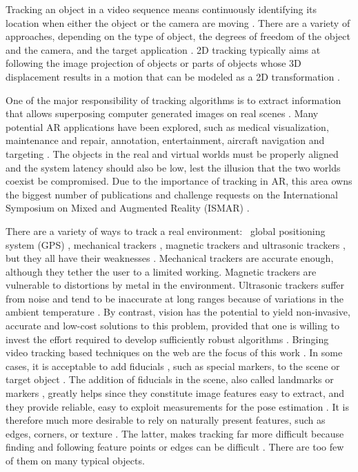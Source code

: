 Tracking an object in a video sequence means continuously identifying its location when either the object or the camera are moving \cite{Lepetit2005}. There are a variety of approaches, depending on the type of object, the degrees of freedom of the object and the camera, and the target application \cite{Lepetit2005,Teichrieb2007}.
2D tracking typically aims at following the image projection of objects or parts of objects whose 3D displacement results in a motion that can be modeled as a 2D transformation \cite{Lepetit2005}.

One of the major responsibility of tracking algorithms is to extract information that allows superposing computer generated images on real scenes \cite{Lepetit2005}. Many potential AR applications have been explored, such as medical visualization, maintenance and repair, annotation, entertainment, aircraft navigation and targeting \cite{Lepetit2005,Krevelen2010}. The objects in the real and virtual worlds must be properly aligned and the system latency should also be low, lest the illusion that the two worlds coexist be compromised. \cite{Lepetit2005} Due to the importance of tracking in AR, this area owns the biggest number of publications and challenge requests on the International Symposium on Mixed and Augmented Reality (ISMAR) \cite{Zhou2008}.

There are a variety of ways to track a real environment: \eg\ global positioning system (GPS) \cite{Krevelen2010}, mechanical trackers \cite{Krevelen2010}, magnetic trackers \cite{Krevelen2010} and ultrasonic trackers \cite{Krevelen2010}, but they all have their weaknesses \cite{Krevelen2010}. Mechanical trackers are accurate enough, although they tether the user to a limited working. Magnetic trackers are vulnerable to distortions by metal in the environment. Ultrasonic trackers suffer from noise and tend to be inaccurate at long ranges because of variations in the ambient temperature \cite{Lepetit2005}.
By contrast, vision has the potential to yield non-invasive, accurate and low-cost solutions to this problem, provided that one is willing to invest the effort required to develop sufficiently robust algorithms \cite{Lepetit2005}. Bringing video tracking based techniques on the web are the focus of this work \cite{Lepetit2005}.
In some cases, it is acceptable to add fiducials \cite{Cho1998}, such as special markers, to the scene or target object \cite{Cho1998,Lepetit2005}. The addition of fiducials in the scene, also called landmarks or markers \cite{Cho1998}, greatly helps since they constitute image features easy to extract, and they provide reliable, easy to exploit measurements for the pose estimation \cite{Cho1998,Lepetit2005}.
It is therefore much more desirable to rely on naturally present features, such as edges, corners, or texture \cite{Lepetit2005}. The latter, makes tracking far more difficult because finding and following feature points or edges can be difficult \cite{Lepetit2005}. There are too few of them on many typical objects.

